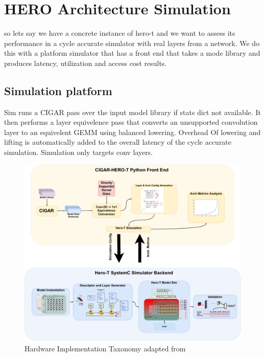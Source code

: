 
\chapter{HERO Architecture Simulation}
\label{chap:hero}

so lets say we have a concrete instance of hero-t and we want to assess its
performance in a cycle accurate simulator with real layers from a network. We do
this with a platform simulator that has a front end that takes a mode library
and produces latency, utilization and access cost results.  

\section{Simulation platform}
\label{chap:hero:sim_platform}

Sim runs a CIGAR pass over the input model library if stats dict not available.
It then performs a layer equivelence pass that converts an unsupported
convolution layer to an equivelent GEMM using balanced lowering. Overhead Of
lowering and lifting is automatically added to the overall latency of the cycle
accurate simulation. Simulation only targets conv layers. 

\begin{figure}[ht]
    \centering
    \includegraphics[scale=0.58]{fig/hero-t-sim-platform.pdf}
    \caption{Hardware Implementation Taxonomy adapted from \cite{maestro}}
    \label{fig:hw_taxonomy}
\end{figure}


